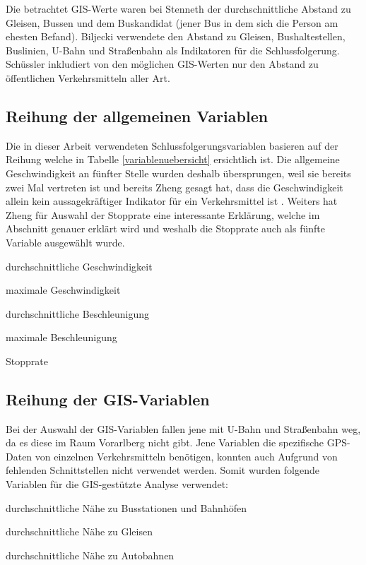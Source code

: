 Die betrachtet GIS-Werte waren bei Stenneth \cite{stenneth_transportation_2011} der durchschnittliche Abstand zu Gleisen, Bussen und dem Buskandidat (jener Bus in dem sich die Person am ehesten Befand). Biljecki verwendete den Abstand zu Gleisen, Bushaltestellen, Buslinien, U-Bahn und Straßenbahn als Indikatoren für die Schlussfolgerung. Schüssler \cite{nadine_schussler_improving_2011} inkludiert von den möglichen GIS-Werten nur den Abstand zu öffentlichen Verkehrsmitteln aller Art.

\subsection{Reihung der allgemeinen Variablen}
Die in dieser Arbeit verwendeten Schlussfolgerungsvariablen basieren auf der Reihung welche in Tabelle \ref{variablenuebersicht} ersichtlich ist. Die allgemeine Geschwindigkeit an fünfter Stelle wurden deshalb übersprungen, weil sie bereits zwei Mal vertreten ist und bereits Zheng gesagt hat, dass die Geschwindigkeit allein kein aussagekräftiger Indikator für ein Verkehrsmittel ist \cite{zheng_understanding_2010}. Weiters hat Zheng für Auswahl der Stopprate eine interessante Erklärung, welche im Abschnitt  genauer erklärt wird und weshalb die Stopprate auch als fünfte Variable ausgewählt wurde. 

\begin{pitemize}
\item durchschnittliche Geschwindigkeit
\item maximale Geschwindigkeit
\item durchschnittliche Beschleunigung
\item maximale Beschleunigung
\item Stopprate
\end{pitemize}


\subsection{Reihung der GIS-Variablen}
Bei der Auswahl der GIS-Variablen fallen jene mit U-Bahn und Straßenbahn weg, da es diese im Raum Vorarlberg nicht gibt. Jene Variablen die spezifische GPS-Daten von einzelnen Verkehrsmitteln benötigen, konnten auch Aufgrund von fehlenden Schnittstellen nicht verwendet werden. Somit wurden folgende Variablen für die GIS-gestützte Analyse verwendet:

\begin{pitemize}
\item durchschnittliche Nähe zu Busstationen und Bahnhöfen
\item durchschnittliche Nähe zu Gleisen	
\item durchschnittliche Nähe zu Autobahnen
\end{pitemize}
\clearpage

